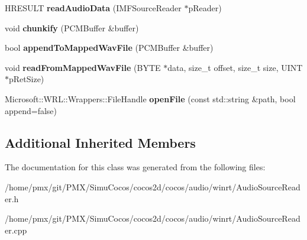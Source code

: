 \begin{DoxyCompactItemize}
H\+R\+E\+S\+U\+LT {\bfseries read\+Audio\+Data} (I\+M\+F\+Source\+Reader $\ast$p\+Reader)
\item 
\mbox{\label{classexperimental_1_1MP3Reader_ae579ed09f6ec08dd89cb78df2ba74a07}} 
void {\bfseries chunkify} (P\+C\+M\+Buffer \&buffer)
\item 
\mbox{\label{classexperimental_1_1MP3Reader_a2803bfa60a5917836ec7ef233489a1fa}} 
bool {\bfseries append\+To\+Mapped\+Wav\+File} (P\+C\+M\+Buffer \&buffer)
\item 
\mbox{\label{classexperimental_1_1MP3Reader_a39659b5bd90ac919212ed461840437ec}} 
void {\bfseries read\+From\+Mapped\+Wav\+File} (B\+Y\+TE $\ast$data, size\+\_\+t offset, size\+\_\+t size, U\+I\+NT $\ast$p\+Ret\+Size)
\item 
\mbox{\label{classexperimental_1_1MP3Reader_a1cadd20bd601cffc8874328a733b1408}} 
Microsoft\+::\+W\+R\+L\+::\+Wrappers\+::\+File\+Handle {\bfseries open\+File} (const std\+::string \&path, bool append=false)
\end{DoxyCompactItemize}
\subsection*{Additional Inherited Members}


The documentation for this class was generated from the following files\+:\begin{DoxyCompactItemize}
\item 
/home/pmx/git/\+P\+M\+X/\+Simu\+Cocos/cocos2d/cocos/audio/winrt/Audio\+Source\+Reader.\+h\item 
/home/pmx/git/\+P\+M\+X/\+Simu\+Cocos/cocos2d/cocos/audio/winrt/Audio\+Source\+Reader.\+cpp\end{DoxyCompactItemize}

